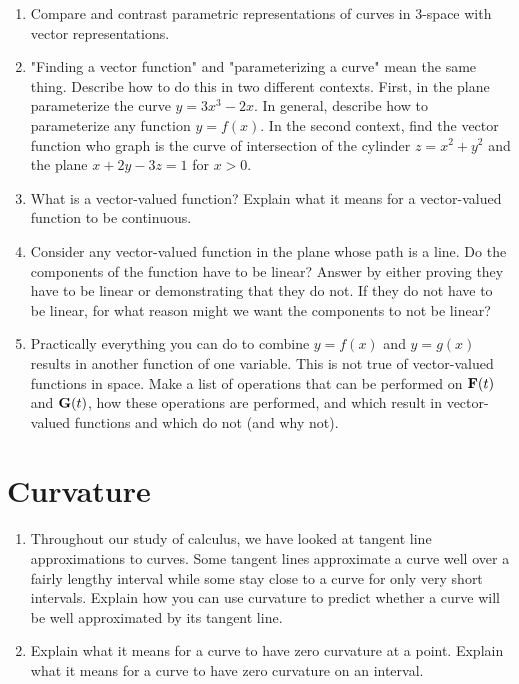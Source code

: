 \begin{enumerate}
\item Compare and contrast parametric representations of curves in 3-space with vector representations.

\item "Finding a vector function" and "parameterizing a curve" mean the same thing.  Describe how to do this in two different contexts.  First, in the plane parameterize the curve $y = 3x^3 - 2x$.  In general, describe how to parameterize any function $y = f(x)$.  In the second context, find the vector function who graph is the curve of intersection of the cylinder $z = x^2 + y^2$ and the plane $x + 2y - 3z = 1$ for $x > 0$.

\item What is a vector-valued function?  Explain what it means for a vector-valued function to be continuous.

\item Consider any vector-valued function in the plane whose path is a line.  Do the components of the function have to be linear?  Answer by either proving they have to be linear or demonstrating that they do not.  If they do not have to be linear, for what reason might we want the components to not be linear?

\item Practically everything you can do to combine $y = f(x)$ and $y = g(x)$ results in another function of one variable.  This is not true of vector-valued functions in space.  Make a list of operations that can be performed on ${\bf{F}}(t)$ and ${\bf{G}}(t)$, how these operations are performed, and which result in vector-valued functions and which do not (and why not).

\end{enumerate}\section{Curvature}\begin{enumerate}


\item Throughout our study of calculus, we have looked at tangent line approximations to curves.  Some tangent lines approximate a curve well over a fairly lengthy interval while some stay close to a curve for only very short intervals.  Explain how you can use curvature to predict whether a curve will be well approximated by its tangent line.  \cite{SM}

\item Explain what it means for a curve to have zero curvature at a point. Explain what it means for a curve to have zero curvature on an interval.  \cite{SM}


\end{enumerate}
